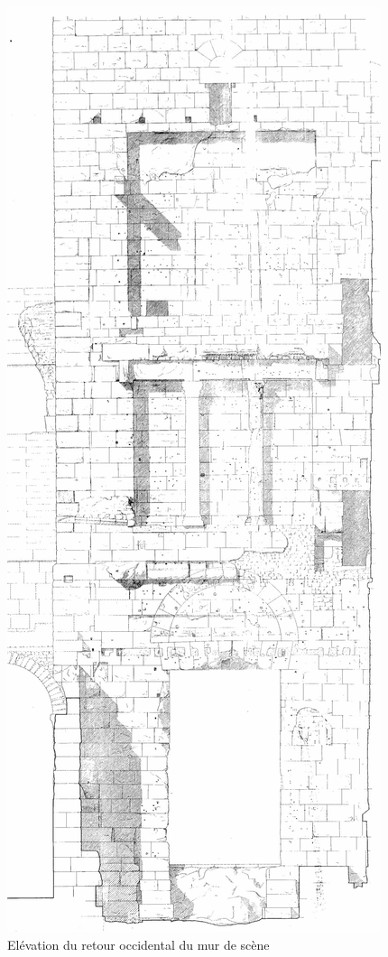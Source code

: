 \begin{figure}[!h]
	\includegraphics[height=0.8\paperheight]{images/retourOccidentalMur}
	\caption[Elévation du retour du mur de scène]{Elévation du retour occidental du mur de scène \cite[Pl. XXVII]{orangePl}}
	\label{retourmur} 
\end{figure} 

